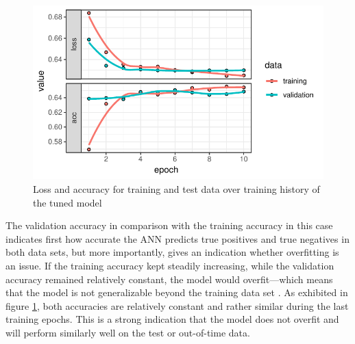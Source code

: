 \documentclass[12pt,a4paper]{article}
\begin{document}
\begin{figure}[ht]
	\centering
  \includegraphics[scale=0.8]{figures/train_history.pdf}
	\caption{Loss and accuracy for training and test data over training history of the tuned model}
	\label{fig_history}
\end{figure}
The validation accuracy in comparison with the training accuracy in this case indicates first how accurate the ANN predicts true positives 
and true negatives in both data sets, but more importantly, gives an indication whether overfitting is an issue.
If the training accuracy kept steadily increasing, while the validation accuracy remained relatively constant, the model would overfit---which means
that the model is not generalizable beyond the training data set \citep{hansenNeuralNetworkEnsembles1990}.
As exhibited in figure \ref{fig_history}, both accuracies are relatively constant and rather similar during the last training epochs.
This is a strong indication that the model does not overfit and will perform similarly well on the test or out-of-time data.
\end{document}
